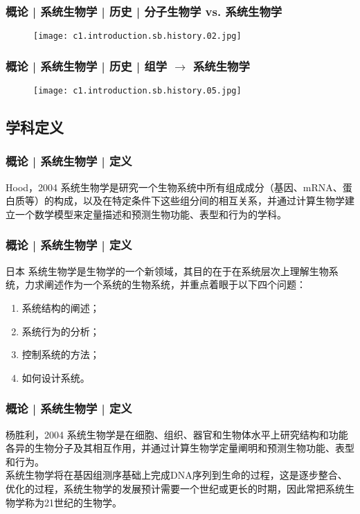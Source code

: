 \begin{frame}
  \frametitle{概论 | 系统生物学 | 历史 | 分子生物学 vs. 系统生物学}
  \begin{figure}
    \centering
    \texttt{[image: c1.introduction.sb.history.02.jpg]}
  \end{figure}
\end{frame}

\begin{frame}
  \frametitle{概论 | 系统生物学 | 历史 | 组学 $\rightarrow$ 系统生物学}
  \begin{figure}
    \centering
    \texttt{[image: c1.introduction.sb.history.05.jpg]}
  \end{figure}
\end{frame}

\subsection{学科定义}
\begin{frame}[label=current]
  \frametitle{概论 | 系统生物学 | 定义}
  \begin{block}{Hood，2004}
系统生物学是研究一个生物系统中所有组成成分（基因、mRNA、蛋白质等）的构成，以及在特定条件下这些组分间的相互关系，并通过计算生物学建立一个数学模型来定量描述和预测生物功能、表型和行为的学科。
  \end{block}
\end{frame}

\begin{frame}[label=current]
  \frametitle{概论 | 系统生物学 | 定义}
  \begin{block}{日本}
系统生物学是生物学的一个新领域，其目的在于在系统层次上理解生物系统，力求阐述作为一个系统的生物系统，并重点着眼于以下四个问题：
  \begin{enumerate}
    \item 系统结构的阐述；
    \item 系统行为的分析；
    \item 控制系统的方法；
    \item 如何设计系统。
  \end{enumerate}
  \end{block}
\end{frame}

\begin{frame}[label=current]
  \frametitle{概论 | 系统生物学 | 定义}
  \begin{block}{杨胜利，2004}
系统生物学是在细胞、组织、器官和生物体水平上研究结构和功能各异的生物分子及其相互作用，并通过计算生物学定量阐明和预测生物功能、表型和行为。\\
\vspace{1em}
系统生物学将在基因组测序基础上完成DNA序列到生命的过程，这是逐步整合、优化的过程，系统生物学的发展预计需要一个世纪或更长的时期，因此常把系统生物学称为21世纪的生物学。
  \end{block}
\end{frame}

